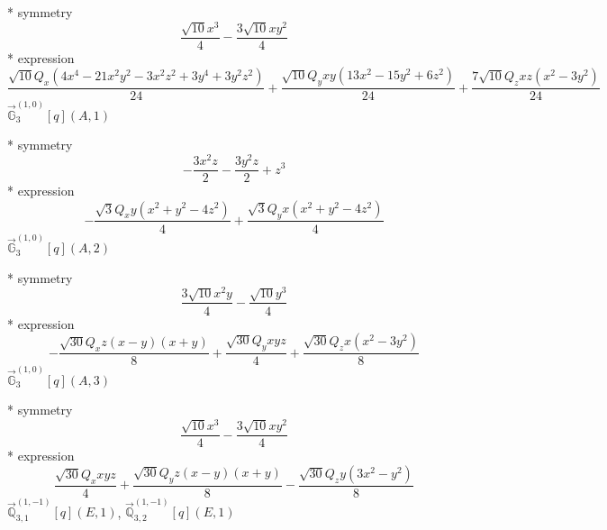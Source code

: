 \documentclass[fleqn,8pt]{jsarticle}
\begin{document}
\noindent\quad ** symmetry
\begin{dmath*}
\frac{\sqrt{10} x^{3}}{4} - \frac{3 \sqrt{10} x y^{2}}{4}
\end{dmath*}
\noindent\quad ** expression
\begin{dmath*}
\frac{\sqrt{10} Q_{x} \left(4 x^{4} - 21 x^{2} y^{2} - 3 x^{2} z^{2} + 3 y^{4} + 3 y^{2} z^{2}\right)}{24} + \frac{\sqrt{10} Q_{y} x y \left(13 x^{2} - 15 y^{2} + 6 z^{2}\right)}{24} + \frac{7 \sqrt{10} Q_{z} x z \left(x^{2} - 3 y^{2}\right)}{24}
\end{dmath*}
\noindent\quad $\vec{\mathbb{G}}_{3}^{(1,0)}[q](A,1)$

\noindent\quad ** symmetry
\begin{dmath*}
- \frac{3 x^{2} z}{2} - \frac{3 y^{2} z}{2} + z^{3}
\end{dmath*}
\noindent\quad ** expression
\begin{dmath*}
- \frac{\sqrt{3} Q_{x} y \left(x^{2} + y^{2} - 4 z^{2}\right)}{4} + \frac{\sqrt{3} Q_{y} x \left(x^{2} + y^{2} - 4 z^{2}\right)}{4}
\end{dmath*}
\noindent\quad $\vec{\mathbb{G}}_{3}^{(1,0)}[q](A,2)$

\noindent\quad ** symmetry
\begin{dmath*}
\frac{3 \sqrt{10} x^{2} y}{4} - \frac{\sqrt{10} y^{3}}{4}
\end{dmath*}
\noindent\quad ** expression
\begin{dmath*}
- \frac{\sqrt{30} Q_{x} z \left(x - y\right) \left(x + y\right)}{8} + \frac{\sqrt{30} Q_{y} x y z}{4} + \frac{\sqrt{30} Q_{z} x \left(x^{2} - 3 y^{2}\right)}{8}
\end{dmath*}
\noindent\quad $\vec{\mathbb{G}}_{3}^{(1,0)}[q](A,3)$

\noindent\quad ** symmetry
\begin{dmath*}
\frac{\sqrt{10} x^{3}}{4} - \frac{3 \sqrt{10} x y^{2}}{4}
\end{dmath*}
\noindent\quad ** expression
\begin{dmath*}
\frac{\sqrt{30} Q_{x} x y z}{4} + \frac{\sqrt{30} Q_{y} z \left(x - y\right) \left(x + y\right)}{8} - \frac{\sqrt{30} Q_{z} y \left(3 x^{2} - y^{2}\right)}{8}
\end{dmath*}
\noindent\quad $\vec{\mathbb{Q}}_{3,1}^{(1,-1)}[q](E,1)$, $\vec{\mathbb{Q}}_{3,2}^{(1,-1)}[q](E,1)$
\end{document}
